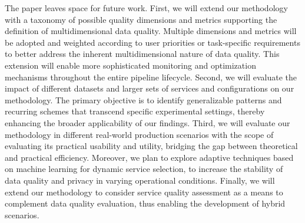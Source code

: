 \documentclass[sn-mathphys-num,referee]{sn-jnl}
\theoremstyle{definition}
\begin{document}
{\color{OurColor}
The paper leaves space for future work. First, we will extend our methodology with a taxonomy of possible quality dimensions and metrics supporting the definition of multidimensional data quality. Multiple dimensions and metrics will be adopted and weighted according to user priorities or task-specific requirements to better address the inherent multidimensional nature of data quality. This extension will enable more sophisticated monitoring and optimization mechanisms throughout the entire pipeline lifecycle. Second, we will evaluate the impact of different datasets and larger sets of services and configurations on our methodology. The primary objective is to identify generalizable patterns and recurring schemes that transcend specific experimental settings, thereby enhancing the broader applicability of our findings. Third, we will evaluate our methodology in different real-world production scenarios with the scope of evaluating its practical usability and utility, bridging the gap between theoretical and practical efficiency. Moreover, we plan to explore adaptive techniques based on machine learning for dynamic service selection, to increase the stability of data quality and privacy in varying operational conditions. Finally, we will extend our methodology to consider service quality assessment as a means to complement data quality evaluation, thus enabling the development of hybrid scenarios.}



\clearpage

\end{document}
